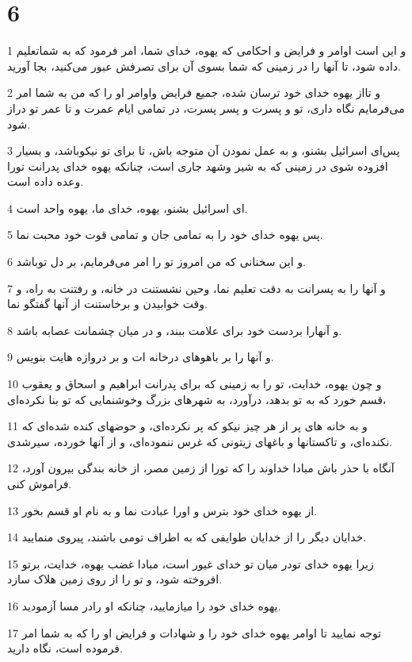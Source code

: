 \chapter{6}

\par 1 و این است اوامر و فرایض و احکامی که یهوه، خدای شما، امر فرمود که به شماتعلیم داده شود، تا آنها را در زمینی که شما بسوی آن برای تصرفش عبور می‌کنید، بجا آورید.
\par 2 و تااز یهوه خدای خود ترسان شده، جمیع فرایض واوامر او را که من به شما امر می‌فرمایم نگاه داری، تو و پسرت و پسر پسرت، در تمامی ایام عمرت و تا عمر تو دراز شود.
\par 3 پس‌ای اسرائیل بشنو، و به عمل نمودن آن متوجه باش، تا برای تو نیکوباشد، و بسیار افزوده شوی در زمینی که به شیر وشهد جاری است، چنانکه یهوه خدای پدرانت تورا وعده داده است.
\par 4 ‌ای اسرائیل بشنو، یهوه، خدای ما، یهوه واحد است.
\par 5 پس یهوه خدای خود را به تمامی جان و تمامی قوت خود محبت نما.
\par 6 و این سخنانی که من امروز تو را امر می‌فرمایم، بر دل توباشد.
\par 7 و آنها را به پسرانت به دقت تعلیم نما، وحین نشستنت در خانه، و رفتنت به راه، و وقت خوابیدن و برخاستنت از آنها گفتگو نما.
\par 8 و آنهارا بردست خود برای علامت ببند، و در میان چشمانت عصابه باشد.
\par 9 و آنها را بر باهوهای درخانه ات و بر دروازه هایت بنویس.
\par 10 و چون یهوه، خدایت، تو را به زمینی که برای پدرانت ابراهیم و اسحاق و یعقوب قسم خورد که به تو بدهد، درآورد، به شهرهای بزرگ وخوشنمایی که تو بنا نکرده‌ای،
\par 11 و به خانه های پر از هر چیز نیکو که پر نکرده‌ای، و حوضهای کنده شده‌ای که نکنده‌ای، و تاکستانها و باغهای زیتونی که غرس ننموده‌ای، و از آنها خورده، سیرشدی.
\par 12 آنگاه با حذر باش مبادا خداوند را که تورا از زمین مصر، از خانه بندگی بیرون آورد، فراموش کنی.
\par 13 از یهوه خدای خود بترس و اورا عبادت نما و به نام او قسم بخور.
\par 14 خدایان دیگر را از خدایان طوایفی که به اطراف تومی باشند، پیروی منمایید.
\par 15 زیرا یهوه خدای تودر میان تو خدای غیور است، مبادا غضب یهوه، خدایت، برتو افروخته شود، و تو را از روی زمین هلاک سازد.
\par 16 یهوه خدای خود را میازمایید، چنانکه او رادر مسا آزمودید.
\par 17 توجه نمایید تا اوامر یهوه خدای خود را و شهادات و فرایض او را که به شما امر فرموده است، نگاه دارید.
